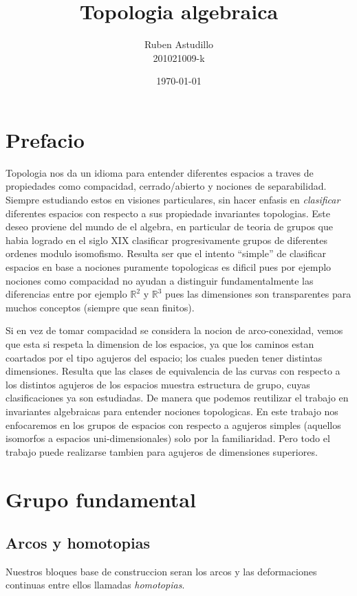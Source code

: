 \documentclass[letterpaper]{article}
\theoremstyle{definition}
\theoremstyle{plain}
\theoremstyle{plain}
\theoremstyle{remark}
\begin{document}
\title{Topologia algebraica}
\author{Ruben Astudillo \\ 201021009-k}
\date{\today}
\maketitle

\section{Prefacio}
Topologia nos da un idioma para entender diferentes espacios a traves de
propiedades como compacidad, cerrado/abierto y nociones de separabilidad.
Siempre estudiando estos en visiones particulares, sin hacer enfasis en
\emph{clasificar} diferentes espacios con respecto a sus propiedade
invariantes topologias. Este deseo proviene del mundo de el algebra, en
particular de teoria de grupos que habia logrado en el siglo XIX
clasificar progresivamente grupos de diferentes ordenes modulo
isomofismo. Resulta ser que el intento ``simple'' de clasificar espacios
en base a nociones puramente topologicas es dificil pues por ejemplo
nociones como compacidad no ayudan a distinguir fundamentalmente las
diferencias entre por ejemplo \(\mathbb{R}^2\) y \(\mathbb{R}^3\) pues
las dimensiones son transparentes para muchos conceptos (siempre que sean
finitos).

Si en vez de tomar compacidad se considera la nocion de arco-conexidad,
vemos que esta si respeta la dimension de los espacios, ya que los
caminos estan coartados por el tipo agujeros del espacio; los cuales
pueden tener distintas dimensiones. Resulta que las clases de
equivalencia de las curvas con respecto a los distintos agujeros de los
espacios muestra estructura de grupo, cuyas clasificaciones ya son
estudiadas. De manera que podemos reutilizar el trabajo en invariantes
algebraicas para entender nociones topologicas. En este trabajo nos
enfocaremos en los grupos de espacios con respecto a agujeros simples
(aquellos isomorfos a espacios uni-dimensionales) solo por la
familiaridad. Pero todo el trabajo puede realizarse tambien para agujeros
de dimensiones superiores.

\section{Grupo fundamental}

\subsection{Arcos y homotopias}
Nuestros bloques base de construccion seran los arcos y las
deformaciones continuas entre ellos llamadas \emph{homotopias}.
\end{document}

